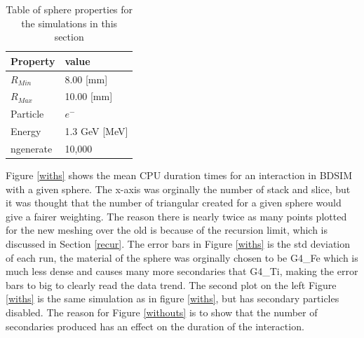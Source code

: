 \documentclass[12pt,a4paper]{article}
\begin{document}
\begin{table}[h!]
\centering
\begin{tabular}{|l|l|}
\hline
Property & value \\ \hline
$R_{Min}$ &  8.00 [mm]\\ \hline
$R_{Max}$ &  10.00 [mm]\\ \hline
Particle &  $e^-$\\ \hline
Energy & 1.3 GeV [MeV]\\ \hline
ngenerate & 10,000\\ \hline
\end{tabular}
\caption{Table of sphere properties for the simulations in this section}
\label{tab1}
\end{table}

\noindent Figure \ref{withs} shows the mean CPU duration times for an interaction in BDSIM with a given sphere. The x-axis was orginally the number of stack and slice, but it was thought that the number of triangular created for a given sphere would give a fairer weighting. The reason there is nearly twice as many points plotted for the new meshing over the old is because of the recursion limit, which is discussed in Section \ref{recur}. The error bars in Figure \ref{withs} is the std deviation of each run, the material of the sphere was orginally chosen to be G4\_Fe which is much less dense and causes many more secondaries that G4\_Ti, making the error bars to big to clearly read the data trend. The second plot on the left Figure \ref{withs} is the same simulation as in figure \ref{withs}, but has secondary particles disabled. The reason for Figure \ref{withouts} is to show that the number of secondaries produced has an effect on the duration of the interaction.
\\\\
\end{document}
